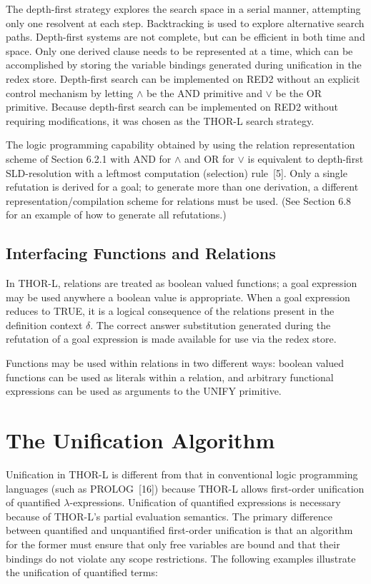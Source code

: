 The depth-first strategy explores the search space in a serial manner,
attempting only one resolvent at each step. Backtracking is used to explore
alternative search paths. Depth-first systems are not complete, but can be
efficient in both time and space. Only one derived clause needs to be
represented at a time, which can be accomplished by storing the variable
bindings generated during unification in the redex store. Depth-first search
can be implemented on RED2 without an explicit control mechanism by letting
\(\wedge\) be the AND primitive and \(\vee\) be the OR primitive. Because
depth-first search can be
implemented on RED2 without requiring modifications, it was chosen as the THOR-L
search strategy.

The logic programming capability obtained by using the relation representation
scheme of Section 6.2.1 with AND for \(\wedge\) and OR for \(\vee\) is
equivalent to depth-first
SLD-resolution with a leftmost computation (selection) rule~[5]. Only a single
refutation is derived for a goal; to generate more than one derivation, a
different representation/compilation scheme for relations must be used. (See
Section 6.8 for an example of how to generate all refutations.)

\subsection{Interfacing Functions and Relations}

In THOR-L, relations are treated as boolean valued functions; a goal expression
may be used anywhere a boolean value is appropriate. When a goal expression
reduces to TRUE, it is a logical consequence of the relations present in the
definition context \(\delta\). The correct answer substitution generated during
the refutation of a goal expression is made available for use via the redex
store.

Functions may be used within relations in two different ways: boolean valued
functions can be used as literals within a relation, and arbitrary functional
expressions can be used as arguments to the UNIFY primitive.

\section{The Unification Algorithm}

Unification in THOR-L is different from that in conventional logic programming
languages (such as PROLOG~[16]) because THOR-L allows first-order unification of
quantified \(\lambda\)-expressions. Unification of quantified expressions is
necessary because of THOR-L's partial evaluation semantics. The primary
difference between quantified and unquantified first-order unification is that
an algorithm for the former must ensure that only free variables are bound and
that their bindings do not violate any scope restrictions. The following
examples illustrate the unification of quantified terms:


